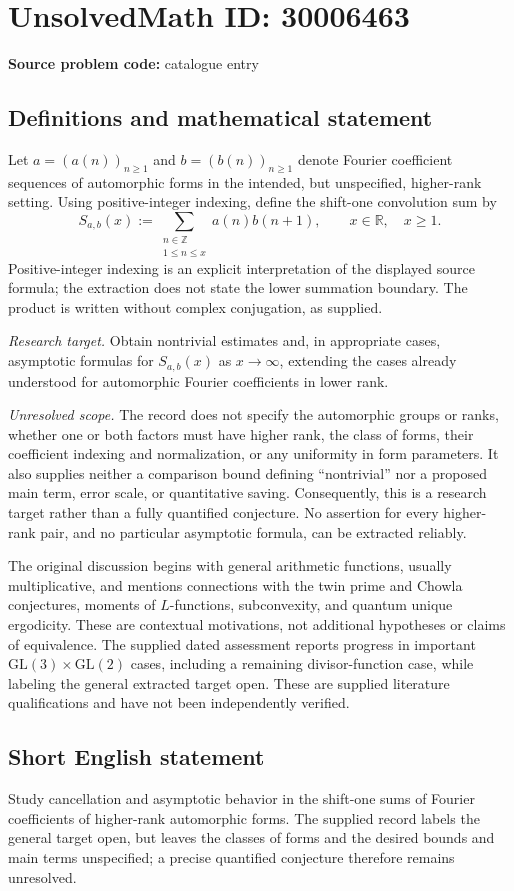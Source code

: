 \documentclass[11pt]{article}
\newcommand{\Z}{\mathbb{Z}}
\newcommand{\R}{\mathbb{R}}
\begin{document}
\section*{UnsolvedMath ID: 30006463}
\textbf{Source problem code:} catalogue entry
\subsection{Definitions and mathematical statement}
Let \(a=(a(n))_{n\geq 1}\) and \(b=(b(n))_{n\geq 1}\) denote Fourier coefficient sequences of automorphic forms in the intended, but unspecified, higher-rank setting. Using positive-integer indexing, define the shift-one convolution sum by
\[
S_{a,b}(x):=\sum_{\substack{n\in\Z\\1\leq n\leq x}}a(n)b(n+1),\qquad x\in\R,\quad x\geq 1.
\]
Positive-integer indexing is an explicit interpretation of the displayed source formula; the extraction does not state the lower summation boundary. The product is written without complex conjugation, as supplied.

\emph{Research target.} Obtain nontrivial estimates and, in appropriate cases, asymptotic formulas for \(S_{a,b}(x)\) as \(x\to\infty\), extending the cases already understood for automorphic Fourier coefficients in lower rank.

\emph{Unresolved scope.} The record does not specify the automorphic groups or ranks, whether one or both factors must have higher rank, the class of forms, their coefficient indexing and normalization, or any uniformity in form parameters. It also supplies neither a comparison bound defining ``nontrivial'' nor a proposed main term, error scale, or quantitative saving. Consequently, this is a research target rather than a fully quantified conjecture. No assertion for every higher-rank pair, and no particular asymptotic formula, can be extracted reliably.

The original discussion begins with general arithmetic functions, usually multiplicative, and mentions connections with the twin prime and Chowla conjectures, moments of \(L\)-functions, subconvexity, and quantum unique ergodicity. These are contextual motivations, not additional hypotheses or claims of equivalence. The supplied dated assessment reports progress in important \(\mathrm{GL}(3)\times\mathrm{GL}(2)\) cases, including a remaining divisor-function case, while labeling the general extracted target open. These are supplied literature qualifications and have not been independently verified.
\subsection{Short English statement}
Study cancellation and asymptotic behavior in the shift-one sums of Fourier coefficients of higher-rank automorphic forms. The supplied record labels the general target open, but leaves the classes of forms and the desired bounds and main terms unspecified; a precise quantified conjecture therefore remains unresolved.
\end{document}
